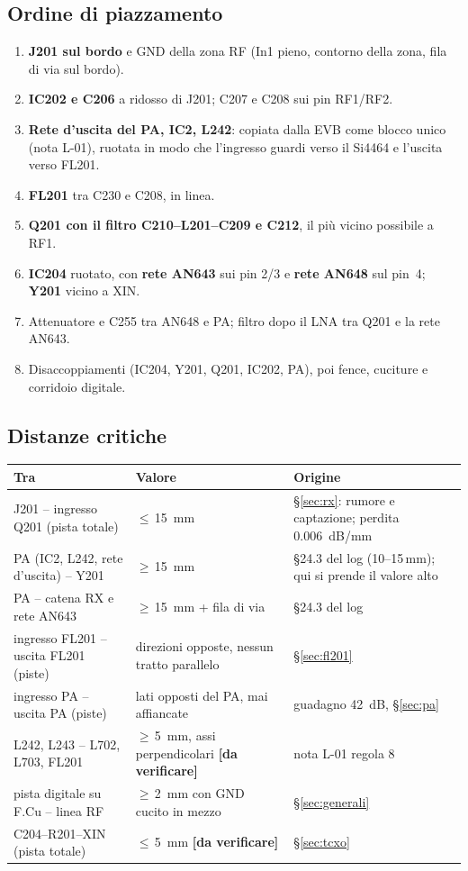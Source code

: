 \documentclass[a4paper,10pt]{article}
\newcommand{\dv}{\textcolor{verfr}{\textbf{[da verificare]}}}
\newcounter{regola}
\begin{document}
\subsection{Ordine di piazzamento}
\begin{enumerate}
\item \textbf{J201 sul bordo} e GND della zona RF (In1 pieno, contorno della zona, fila di via sul bordo).
\item \textbf{IC202 e C206} a ridosso di J201; C207 e C208 sui pin RF1/RF2.
\item \textbf{Rete d'uscita del PA, IC2, L242}: copiata dalla EVB come blocco unico (nota L-01), ruotata
      in modo che l'ingresso guardi verso il Si4464 e l'uscita verso FL201.
\item \textbf{FL201} tra C230 e C208, in linea.
\item \textbf{Q201 con il filtro C210--L201--C209 e C212}, il più vicino possibile a RF1.
\item \textbf{IC204} ruotato, con \textbf{rete AN643} sui pin 2/3 e \textbf{rete AN648} sul pin~4;
      \textbf{Y201} vicino a XIN.
\item Attenuatore e C255 tra AN648 e PA; filtro dopo il LNA tra Q201 e la rete AN643.
\item Disaccoppiamenti (IC204, Y201, Q201, IC202, PA), poi fence, cuciture e corridoio digitale.
\end{enumerate}

\subsection{Distanze critiche}
{\small
\begin{tabularx}{\linewidth}{@{}L{55mm}L{30mm}Y@{}}
\toprule
\textbf{Tra} & \textbf{Valore} & \textbf{Origine}\\
\midrule
J201 -- ingresso Q201 (pista totale) & $\le$\,\SI{15}{mm} & \S\ref{sec:rx}: rumore e captazione; perdita \SI{0.006}{dB/mm}\\
PA (IC2, L242, rete d'uscita) -- Y201 & $\ge$\,\SI{15}{mm} & \S24.3 del log (10--15\,mm); qui si prende il valore alto\\
PA -- catena RX e rete AN643 & $\ge$\,\SI{15}{mm} + fila di via & \S24.3 del log\\
ingresso FL201 -- uscita FL201 (piste) & direzioni opposte, nessun tratto parallelo & \S\ref{sec:fl201}\\
ingresso PA -- uscita PA (piste) & lati opposti del PA, mai affiancate & guadagno \SI{42}{dB}, \S\ref{sec:pa}\\
L242, L243 -- L702, L703, FL201 & $\ge$\,\SI{5}{mm}, assi perpendicolari \dv & nota L-01 regola 8\\
pista digitale su F.Cu -- linea RF & $\ge$\,\SI{2}{mm} con GND cucito in mezzo & \S\ref{sec:generali}\\
C204--R201--XIN (pista totale) & $\le$\,\SI{5}{mm} \dv & \S\ref{sec:tcxo}\\
\bottomrule
\end{tabularx}}
\end{document}
